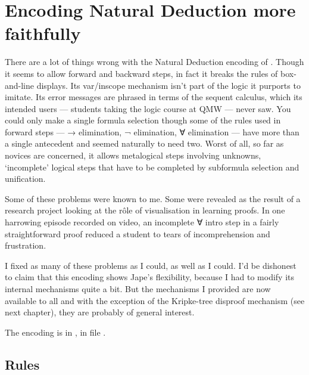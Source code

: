 \chapter{Encoding Natural Deduction more faithfully}
\label{chap:I2L}

There are a lot of things wrong with the Natural Deduction encoding of . Though it seems to allow forward and backward steps, in fact it breaks the rules of box-and-line displays. Its var/inscope mechanism isn't part of the logic it purports to imitate. Its error messages are phrased in terms of the sequent calculus, which its intended users --- students taking the logic course at QMW --- never saw. You could only make a single formula selection though some of the rules used in forward steps --- → elimination, ¬ elimination, ∀ elimination --- have more than a single antecedent and seemed naturally to need two. Worst of all, so far as novices are concerned, it allows metalogical steps involving unknowns, `incomplete' logical steps that have to be completed by subformula selection and unification.

Some of these problems were known to me. Some were revealed as the result of a research project looking at the r\^{o}le of visualisation in learning proofs. In one harrowing episode recorded on video, an incomplete ∀ intro step in a fairly straightforward proof reduced a student to tears of incomprehension and frustration. 

I fixed as many of these problems as I could, as well as I could. I'd be dishonest to claim that this encoding shows Jape's flexibility, because I had to modify its internal mechanisms quite a bit. But the mechanisms I provided are now available to all and with the exception of the Kripke-tree disproof mechanism (see next chapter), they are probably of general interest.

The encoding is in , in file .

\section{Rules}

